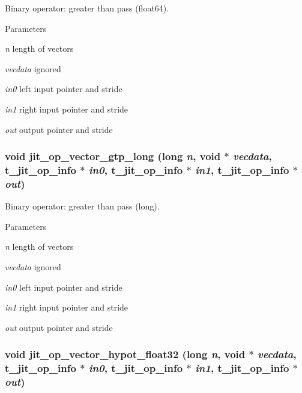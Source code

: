 Binary operator: greater than pass (float64). 
\begin{DoxyParams}{Parameters}
\item[{\em n}]length of vectors \item[{\em vecdata}]ignored \item[{\em in0}]left input pointer and stride \item[{\em in1}]right input pointer and stride \item[{\em out}]output pointer and stride \end{DoxyParams}
\hypertarget{group__opvecmod_ga23ab889981eec3cbbbcd8bc506fbb4e6}{
\subsubsection[{jit\_\-op\_\-vector\_\-gtp\_\-long}]{\setlength{\rightskip}{0pt plus 5cm}void jit\_\-op\_\-vector\_\-gtp\_\-long (long {\em n}, \/  void $\ast$ {\em vecdata}, \/  {\bf t\_\-jit\_\-op\_\-info} $\ast$ {\em in0}, \/  {\bf t\_\-jit\_\-op\_\-info} $\ast$ {\em in1}, \/  {\bf t\_\-jit\_\-op\_\-info} $\ast$ {\em out})}}
\label{group__opvecmod_ga23ab889981eec3cbbbcd8bc506fbb4e6}


Binary operator: greater than pass (long). 
\begin{DoxyParams}{Parameters}
\item[{\em n}]length of vectors \item[{\em vecdata}]ignored \item[{\em in0}]left input pointer and stride \item[{\em in1}]right input pointer and stride \item[{\em out}]output pointer and stride \end{DoxyParams}
\hypertarget{group__opvecmod_ga4cb86d8baf03ef12a90096aef213784d}{
\subsubsection[{jit\_\-op\_\-vector\_\-hypot\_\-float32}]{\setlength{\rightskip}{0pt plus 5cm}void jit\_\-op\_\-vector\_\-hypot\_\-float32 (long {\em n}, \/  void $\ast$ {\em vecdata}, \/  {\bf t\_\-jit\_\-op\_\-info} $\ast$ {\em in0}, \/  {\bf t\_\-jit\_\-op\_\-info} $\ast$ {\em in1}, \/  {\bf t\_\-jit\_\-op\_\-info} $\ast$ {\em out})}}
\label{group__opvecmod_ga4cb86d8baf03ef12a90096aef213784d}


